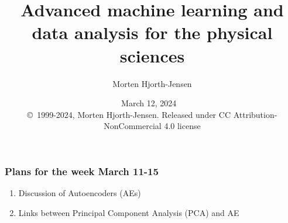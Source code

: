 \documentclass{beamer}
\begin{document}

\newcommand{\exercisesection}[1]{\subsection*{#1}}







\title{Advanced machine learning and data analysis for the physical sciences}


\author{Morten Hjorth-Jensen}

\date{March 12, 2024
\ \\ 
{\tiny \copyright\ 1999-2024, Morten Hjorth-Jensen. Released under CC Attribution-NonCommercial 4.0 license}
}

\begin{frame}
\titlepage
\end{frame}

\begin{frame}
\frametitle{Plans for the week March 11-15}

\begin{block}{}
\begin{enumerate}
\item Discussion of Autoencoders (AEs)

\item Links between Principal Component Analysis (PCA) and AE
\end{enumerate}

\noindent
\end{block}
\end{frame}
\end{document}
